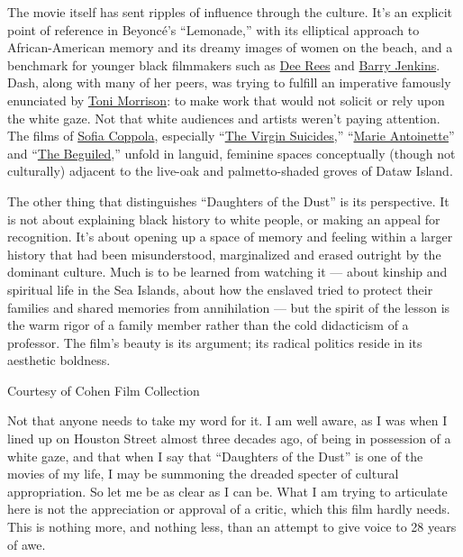 The movie itself has sent ripples of influence through the culture. It's
an explicit point of reference in Beyoncé's ``Lemonade,'' with its
elliptical approach to African-American memory and its dreamy images of
women on the beach, and a benchmark for younger black filmmakers such as
\href{https://www.nytimes.com/2020/02/06/magazine/dee-rees-black-female-director.html}{Dee
Rees} and
\href{https://www.nytimes.com/interactive/2018/10/04/magazine/barry-jenkins-james-baldwin-if-beale-street-could-talk.html}{Barry
Jenkins}. Dash, along with many of her peers, was trying to fulfill an
imperative famously enunciated by
\href{https://www.nytimes.com/topic/person/toni-morrison}{Toni
Morrison}: to make work that would not solicit or rely upon the white
gaze. Not that white audiences and artists weren't paying attention. The
films of
\href{https://www.nytimes.com/2015/08/17/t-magazine/alice-alba-rohrwacher.html}{Sofia
Coppola}, especially
``\href{https://www.nytimes.com/watching/titles/the-virgin-suicides}{The
Virgin Suicides},''
``\href{https://www.nytimes.com/watching/titles/marie-antoinette}{Marie
Antoinette}'' and
``\href{https://www.nytimes.com/watching/titles/the-beguiled}{The
Beguiled},'' unfold in languid, feminine spaces conceptually (though not
culturally) adjacent to the live-oak and palmetto-shaded groves of Dataw
Island.

The other thing that distinguishes ``Daughters of the Dust'' is its
perspective. It is not about explaining black history to white people,
or making an appeal for recognition. It's about opening up a space of
memory and feeling within a larger history that had been misunderstood,
marginalized and erased outright by the dominant culture. Much is to be
learned from watching it --- about kinship and spiritual life in the Sea
Islands, about how the enslaved tried to protect their families and
shared memories from annihilation --- but the spirit of the lesson is
the warm rigor of a family member rather than the cold didacticism of a
professor. The film's beauty is its argument; its radical politics
reside in its aesthetic boldness.

Courtesy of Cohen Film Collection

Not that anyone needs to take my word for it. I am well aware, as I was
when I lined up on Houston Street almost three decades ago, of being in
possession of a white gaze, and that when I say that ``Daughters of the
Dust'' is one of the movies of my life, I may be summoning the dreaded
specter of cultural appropriation. So let me be as clear as I can be.
What I am trying to articulate here is not the appreciation or approval
of a critic, which this film hardly needs. This is nothing more, and
nothing less, than an attempt to give voice to 28 years of awe.

